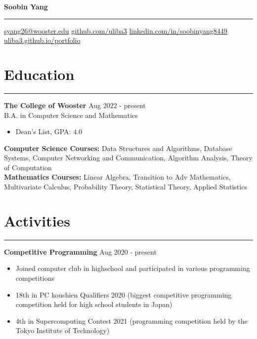 \documentclass[a4paper,12pt]{article}
\begin{document}
\linespread{1}\selectfont
{}
\newcommand{\sectionrule}[1]{
  \vspace{-15pt}
  \section*{#1}
  \vspace{-5pt}
  \hrule
  \vspace{5pt}
}
\pagestyle{empty}

\begin{center}
    \textbf{\LARGE Soobin Yang}
    \vspace{5pt}
    \hrule
    \vspace{5pt}
    \faEnvelope \hspace{1pt} \href{mailto:syang26@wooster.edu}{syang26@wooster.edu} \hspace{5pt}
    \faGithubSquare \hspace{1pt} \href{https://github.com/uliba3}{github.com/uliba3} \hspace{5pt}
    \faLinkedinSquare \hspace{1pt} \href{https://linkedin.com/in/soobinyang8449}{linkedin.com/in/soobinyang8449} \\
    \faGlobe \hspace{1pt} \href{https://uliba3.github.io/portfolio/}{uliba3.github.io/portfolio}
\end{center}

\sectionrule{Education}
\textbf{The College of Wooster} \hfill \textnormal{Aug 2022 - present}\\
\textnormal{B.A. in Computer Science and Mathematics}
\begin{itemize}
    \item Dean's List, GPA: 4.0
\end{itemize}
\textbf{Computer Science Courses:} 
\textnormal{Data Structures and Algorithms, Database Systems, Computer Networking and Communication, Algorithm Analysis, Theory of Computation}\\
\textbf{Mathematics Courses:} 
\textnormal{Linear Algebra, Transition to Adv Mathematics, Multivariate Calculus, Probability Theory, Statistical Theory, Applied Statistics}

\sectionrule{Activities}
\textbf{Competitive Programming} \hfill \textnormal{Aug 2020 - present}
\begin{itemize}
    \item Joined computer club in highschool and participated in various programming competitions
    \item 18th in PC koushien Qualifiers 2020 (biggest competitive programming competition held for high school students in Japan)
    \item 4th in Supercomputing Contest 2021 (programming competition held by the Tokyo Institute of Technology)
\end{itemize}
\end{document}
